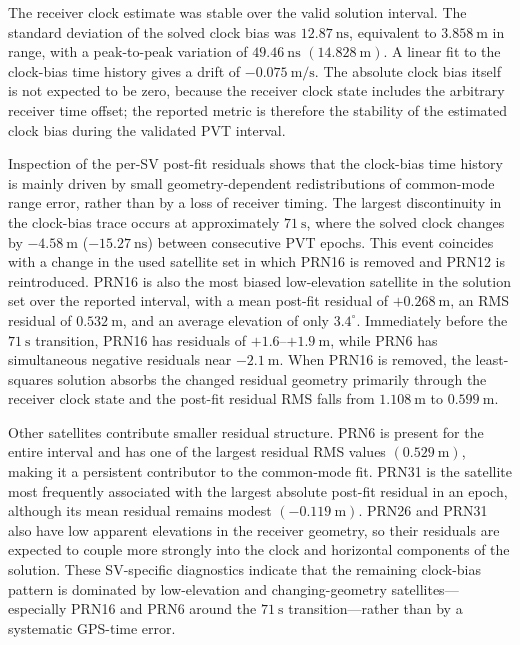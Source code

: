 The receiver clock estimate was stable over the valid solution interval. The standard
deviation of the solved clock bias was \(12.87~\mathrm{ns}\), equivalent to
\(3.858~\mathrm{m}\) in range, with a peak-to-peak variation of \(49.46~\mathrm{ns}\)
\((14.828~\mathrm{m})\). A linear fit to the clock-bias time history gives a drift of
\(-0.075~\mathrm{m/s}\). The absolute clock bias itself is not expected to be zero,
because the receiver clock state includes the arbitrary receiver time offset; the
reported metric is therefore the stability of the estimated clock bias during the
validated PVT interval.

Inspection of the per-SV post-fit residuals shows that the clock-bias time history is
mainly driven by small geometry-dependent redistributions of common-mode range error,
rather than by a loss of receiver timing. The largest discontinuity in the clock-bias
trace occurs at approximately \(71~\mathrm{s}\), where the solved clock changes by
\(-4.58~\mathrm{m}\) (\(-15.27~\mathrm{ns}\)) between consecutive PVT epochs. This
event coincides with a change in the used satellite set in which PRN16 is removed and
PRN12 is reintroduced. PRN16 is also the most biased low-elevation satellite in the
solution set over the reported interval, with a mean post-fit residual of
\(+0.268~\mathrm{m}\), an RMS residual of \(0.532~\mathrm{m}\), and an average
elevation of only \(3.4^\circ\). Immediately before the \(71~\mathrm{s}\) transition,
PRN16 has residuals of \(+1.6\)--\(+1.9~\mathrm{m}\), while PRN6 has simultaneous
negative residuals near \(-2.1~\mathrm{m}\). When PRN16 is removed, the least-squares
solution absorbs the changed residual geometry primarily through the receiver clock
state and the post-fit residual RMS falls from \(1.108~\mathrm{m}\) to
\(0.599~\mathrm{m}\).

Other satellites contribute smaller residual structure. PRN6 is present for the
entire interval and has one of the largest residual RMS values
\((0.529~\mathrm{m})\), making it a persistent contributor to the common-mode fit.
PRN31 is the satellite most frequently associated with the largest absolute post-fit
residual in an epoch, although its mean residual remains modest
\((-0.119~\mathrm{m})\). PRN26 and PRN31 also have low apparent elevations in the
receiver geometry, so their residuals are expected to couple more strongly into the
clock and horizontal components of the solution. These SV-specific diagnostics
indicate that the remaining clock-bias pattern is dominated by low-elevation and
changing-geometry satellites---especially PRN16 and PRN6 around the \(71~\mathrm{s}\)
transition---rather than by a systematic GPS-time error.


